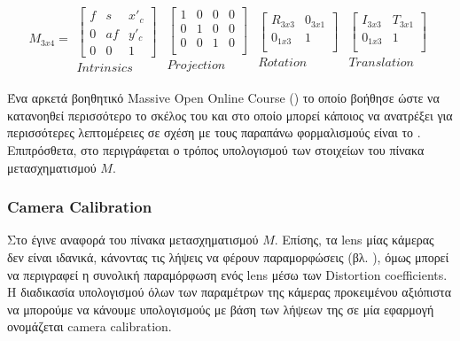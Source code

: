 \begin{gather}
	M_{3x4} = 
    \begin{matrix}
        \begin{bmatrix} 
            f & s & x'_c \\ 
            0 & af & y'_c \\
            0  & 0 & 1
        \end{bmatrix}\\
        Intrinsics
    \end{matrix}
    \begin{matrix}
        \begin{bmatrix} 
            1 & 0 & 0 & 0 \\ 
            0 & 1 & 0 & 0 \\ 
            0 & 0 & 1 & 0 \\ 
        \end{bmatrix}\\
        Projection
    \end{matrix}
    \begin{matrix}
        \begin{bmatrix} 
            R_{3x3} & 0_{3x1} \\ 
            0_{1x3} & 1 \\  
        \end{bmatrix}\\
        Rotation
    \end{matrix}
    \begin{matrix}
        \begin{bmatrix} 
            I_{3x3} & T_{3x1} \\ 
            0_{1x3} & 1 \\  
        \end{bmatrix}\\
        Translation
    \end{matrix} \label{eq:world-to-image-matrix}
\end{gather}

Ένα αρκετά βοηθητικό Massive Open Online Course () το οποίο βοήθησε ώστε να κατανοηθεί περισσότερο το σκέλος του  και στο οποίο μπορεί κάποιος να ανατρέξει για περισσότερες λεπτομέρειες σε σχέση με τους παραπάνω φορμαλισμούς είναι το \cite{introduction-to-computer-vision}. Επιπρόσθετα, στο  περιγράφεται ο τρόπος υπολογισμού των στοιχείων του πίνακα μετασχηματισμού $M$.

\subsubsection{Camera Calibration} \label{sec:camera-calibration}
Στο  έγινε αναφορά του πίνακα μετασχηματισμού $M$. Επίσης, τα lens μίας κάμερας δεν είναι ιδανικά, κάνοντας τις λήψεις να φέρουν παραμορφώσεις (βλ. ), όμως μπορεί να περιγραφεί η συνολική παραμόρφωση ενός lens μέσω των Distortion coefficients. Η διαδικασία υπολογισμού όλων των παραμέτρων της κάμερας προκειμένου αξιόπιστα να μπορούμε να κάνουμε υπολογισμούς με βάση των λήψεων της σε μία  εφαρμογή ονομάζεται camera calibration. 

